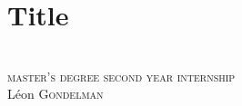 




\let\why\lstinline
\let\emph\alert
\beamertemplatenavigationsymbolsempty
\newcommand{\HRule}{\rule{\linewidth}{0.1mm}}

\newenvironment{aquote}[1]
  {\savebox\mybox{#1}\begin{quote}}
  {\signed{\usebox\mybox}\end{quote}}




\newcommand{\bwedge}{\boldsymbol{~\wedge~}}
\newcommand{\bvee}{\boldsymbol{~\vee~}}
\newcommand{\brarr}{\boldsymbol{~\Rightarrow~}}
\addtocounter{framenumber}{-1}

\newcommand{\crond}[2]{
\tikz \node[draw,circle,scale=0.21,fill=#2]{\black \Huge  \textbf{#1}};}
\newcommand{\rond}[1]{
\tikz \node[draw,circle,scale=0.21,fill=red]{\black \Huge  \textbf{#1}};}

\section*{Title}
\begin{frame}
\begin{center}
\vspace{-1.cm}

\textsc{}\\
 \textsc{ \scriptsize master's degree second year internship}\\[0.4cm]
{\small  L\'eon \textsc{Gondelman}}  \\[0.5cm]

\end{center}
\end{frame}





